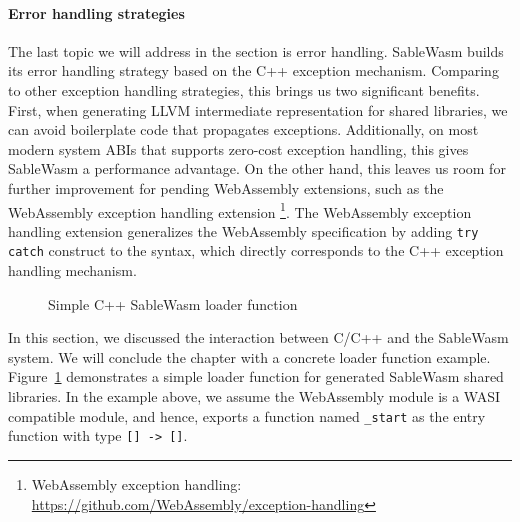\paragraph{Error handling strategies}
The last topic we will address in the section is error handling. SableWasm
builds its error handling strategy based on the C++ exception mechanism.
Comparing to other exception handling strategies, this brings us two
significant benefits. First, when generating LLVM intermediate representation
for shared libraries, we can avoid boilerplate code that propagates exceptions.
Additionally, on most modern system ABIs that supports zero-cost exception
handling, this gives SableWasm a performance advantage. On the other hand, this
leaves us room for further improvement for pending WebAssembly extensions, such
as the WebAssembly exception handling extension \footnote{WebAssembly exception
    handling: \url{https://github.com/WebAssembly/exception-handling}}.
The WebAssembly exception handling extension generalizes the WebAssembly
specification by adding \texttt{try catch} construct to the syntax, which
directly corresponds to the C++ exception handling mechanism.

\begin{figure}
    \centering
    
    \caption{Simple C++ SableWasm loader function}
    \label{fig:sablewasm-loader}
\end{figure}

In this section, we discussed the interaction between C/C++ and the SableWasm
system. We will conclude the chapter with a concrete loader function example.
Figure~\ref{fig:sablewasm-loader} demonstrates a simple loader function for
generated SableWasm shared libraries. In the example above, we assume the
WebAssembly module is a WASI compatible module, and hence, exports a function
named \texttt{\_start} as the entry function with type \texttt{[] -> []}.
